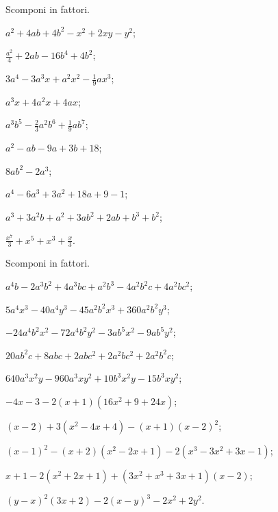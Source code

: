 \begin{esercizio}[\Ast]
 \label{ese:13.85}
 Scomponi in fattori.
\begin{multicols}{2}
 \begin{enumeratea}
\item $a^{2}+4{ab}+4b^{2}-x^{2}+2xy-y^{2}$;
\item $\frac{a^{2}}{4}+2{ab}-16b^{4}+4b^{2}$;
\item $3a^{4}-3a^{3}x+a^{2}x^{2}-\frac{1}{9}ax^{3}$;
\item $a^{3}x+4a^{2}x+4ax$;
\item $a^{3}b^{5}-\frac{2}{3}a^{2}b^{6}+\frac{1}{9}ab^{7}$;
\item $a^{2}-{ab}-9a+3b+18$;
\item $8{ab}^{2}-2a^{3}$;
\item $a^{4}-6a^{3}+3a^{2}+18a+9-1$;
\item $a^{3}+3a^{2}b+a^{2}+3{ab}^{2}+2{ab}+b^{3}+b^{2}$;
\item $\frac{x^{7}}{3}+x^{5}+x^{3}+\frac{x}{3}$.
 \end{enumeratea}
\end{multicols}
\end{esercizio}

\begin{esercizio}[\Ast]
 \label{ese:13.86}
 Scomponi in fattori.
 \begin{enumeratea}
\item $a^{4}b-2a^{3}b^{2}+4a^{3}{bc}+a^{2}b^{3}-4a^{2}b^{2}c+4a^{2}bc^{2}$;
\item $5a^{4}x^{3}-40a^{4}y^{3}-45a^{2}b^{2}x^{3}+360a^{2}b^{2}y^{3}$;
\item $-24a^{4}b^{2}x^{2}-72a^{4}b^{2}y^{2}-3ab^{5}x^{2}-9ab^{5}y^{2}$;
\item $20ab^{2}c+8abc+2abc^{2}+2a^{2}bc^{2}+2a^{2}b^{2}c$;
\item $640a^{3}x^{2}y-960a^{3}xy^{2}+10b^{3}x^{2}y-15b^{3}xy^{2}$;
\item $-4x-3-2(x+1)(16x^{2}+9+24x)$;
\item $(x-2)+3(x^{2}-4x+4)-(x+1)(x-2)^{2}$;
\item $(x-1)^{2}-(x+2)(x^{2}-2x+1)-2(x^{3}-3x^{2}+3x-1)$;
\item $x+1-2(x^{2}+2x+1)+(3x^{2}+x^{3}+3x+1)(x-2)$;
\item $(y-x)^{2}(3x+2)-2(x-y)^{3}-2x^{2}+2y^{2}$.
 \end{enumeratea}
\end{esercizio}

